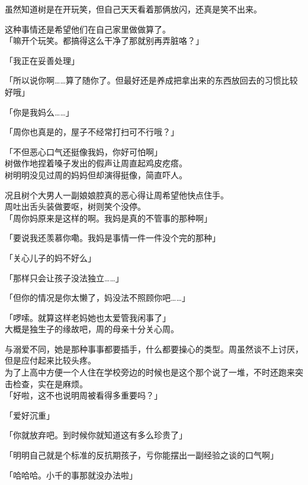 虽然知道树是在开玩笑，但自己天天看着那俩放闪，还真是笑不出来。

这种事情还是希望他们在自己家里做做算了。\\

「嘛开个玩笑。都搞得这么干净了那就别再弄脏咯？」

「我正在妥善处理」

「所以说你啊……算了随你了。但最好还是养成把拿出来的东西放回去的习惯比较好哦」

「你是我妈么……」

「周你也真是的，屋子不经常打扫可不行哦？」

「不但恶心口气还挺像我妈，你好可怕啊」\\

树做作地捏着嗓子发出的假声让周直起鸡皮疙瘩。\\

树明明没见过周的妈妈但却演得挺像，简直吓人。

况且树个大男人一副娘娘腔真的恶心得让周希望他快点住手。\\

周吐出舌头装做要呕，树则笑个没停。\\

「周你妈原来是这样的啊。我妈是真的不管事的那种啊」

「要说我还羡慕你嘞。我妈是事情一件一件没个完的那种」

「关心儿子的妈不好么」

「那样只会让孩子没法独立……」

「但你的情况是你太懒了，妈没法不照顾你吧……」

「啰嗦。就算这样老妈她也太爱管我闲事了」\\

大概是独生子的缘故吧，周的母亲十分关心周。

与溺爱不同，她是那种事事都要插手，什么都要操心的类型。周虽然谈不上讨厌，但是应付起来比较头疼。\\

为了上高中方便一个人住在学校旁边的时候也是这个那个说了一堆，不时还跑来突击检查，实在是麻烦。\\

「好啦，这不也说明周被看得多重要吗？」

「爱好沉重」

「你就放弃吧。到时候你就知道这有多么珍贵了」

「明明自己就是个标准的反抗期孩子，亏你能摆出一副经验之谈的口气啊」

「哈哈哈。小千的事那就没办法啦」\\

